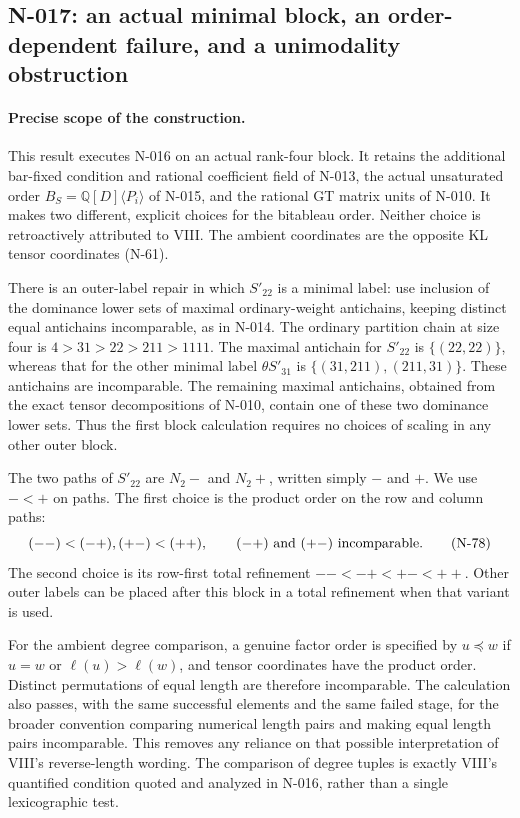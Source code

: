 \subsection{N-017: an actual minimal block, an order-dependent failure, and a unimodality obstruction}
\label{sec:nonstandard-first-block}

\paragraph{Precise scope of the construction.}
This result executes N-016 on an actual rank-four block.  It retains
the additional bar-fixed condition and rational coefficient field of
N-013, the actual unsaturated order $B_S=\mathbb Q[D]\langle P_i\rangle$
of N-015, and the rational GT matrix units of N-010.  It makes two
different, explicit choices for the bitableau order.  Neither choice
is retroactively attributed to VIII.  The ambient coordinates are
the opposite KL tensor coordinates (N-61).

There is an outer-label repair in which $S'_{22}$ is a minimal
label: use inclusion of the dominance lower sets of maximal
ordinary-weight antichains, keeping distinct equal antichains
incomparable, as in N-014.  The ordinary partition chain at size four is
$4>31>22>211>1111$.  The maximal antichain for $S'_{22}$ is
$\{(22,22)\}$, whereas that for the other minimal label
$\theta S'_{31}$ is $\{(31,211),(211,31)\}$.  These antichains are
incomparable.  The remaining maximal antichains, obtained from the
exact tensor decompositions of N-010, contain one of these two
dominance lower sets.  Thus the first block calculation requires no
choices of scaling in any other outer block.

The two paths of $S'_{22}$ are $N_2-$ and $N_2+$, written simply
$-$ and $+$.  We use $-<+$ on paths.  The first choice is the product
order on the row and column paths:
\[
 (-- )<(-+),(+-)<(++),\qquad (-+)\ \hbox{and}\ (+-)\ 
 \hbox{incomparable}.
 \tag{N-78}
\]
The second choice is its row-first total refinement
$--<-+<+-<++$.  Other outer labels can be placed after this block
in a total refinement when that variant is used.

For the ambient degree comparison, a genuine factor order is
specified by $u\preceq w$ if $u=w$ or $\ell(u)>\ell(w)$, and tensor
coordinates have the product order.  Distinct permutations of equal
length are therefore incomparable.  The calculation also passes,
with the same successful elements and the same failed stage, for
the broader convention comparing numerical length pairs and making
equal length pairs incomparable.  This removes any reliance on that
possible interpretation of VIII's reverse-length wording.  The
comparison of degree tuples is exactly VIII's quantified condition
quoted and analyzed in N-016, rather than a single lexicographic test.

